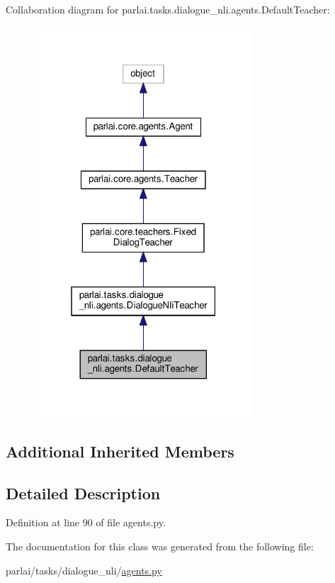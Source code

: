 Collaboration diagram for parlai.\+tasks.\+dialogue\+\_\+nli.\+agents.\+Default\+Teacher\+:
\nopagebreak
\begin{figure}[H]
\begin{center}
\leavevmode
\includegraphics[width=232pt]{classparlai_1_1tasks_1_1dialogue__nli_1_1agents_1_1DefaultTeacher__coll__graph}
\end{center}
\end{figure}
\subsection*{Additional Inherited Members}


\subsection{Detailed Description}


Definition at line 90 of file agents.\+py.



The documentation for this class was generated from the following file\+:\begin{DoxyCompactItemize}
\item 
parlai/tasks/dialogue\+\_\+nli/\hyperlink{parlai_2tasks_2dialogue__nli_2agents_8py}{agents.\+py}\end{DoxyCompactItemize}
